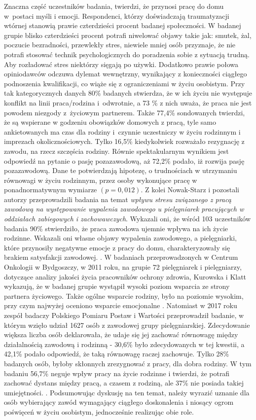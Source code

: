 \documentclass[a4paper,12pt,twoside,openright]{mwrep}
\begin{document}
 
  Znaczna część uczestników badania,  twierdzi, że przynosi pracę do domu w~postaci myśli i emocji. Respondenci, którzy doświadczają traumatyzacji wtórnej stanowią prawie czterdzieści procent badanej społeczności. W badanej grupie blisko czterdzieści procent potrafi niwelować objawy takie jak: smutek, żal, poczucie bezradności, przewlekły stres, niewiele mniej osób  przyznaje, że nie potrafi stosować technik psychologicznych do poradzenia sobie z sytuacją trudną.  Aby rozładować stres niektórzy  sięgają  po używki.   Dodatkowo prawie połowa opiniodawców odczuwa dylemat wewnętrzny, wynikający z konieczności ciągłego podnoszenia kwalifikacji, co wiąże się z ograniczeniami w życiu osobistym.  Przy tak kategorycznych danych 80\% badanych  stwierdza, że w ich życiu nie występuje konflikt na linii praca/rodzina i~odwrotnie, a  73 \%  z nich uważa, że praca nie jest powodem niezgody z~życiowym partnerem.  Także 77,4\%   sondowanych  twierdzi, że są wspierane w godzeniu obowiązków domowych z pracą, tyle samo ankietowanych ma czas dla rodziny i~czynnie uczestniczy w życiu rodzinnym i imprezach okolicznościowych. Tylko 16,5\%  kiedykolwiek rozważało rezygnację z zawodu, na rzecz szczęścia rodziny. Równie spektakularnym wynikiem jest odpowiedź na pytanie o pasję pozazawodową, aż 72,2\%  podało, iż rozwija pasję pozazawodową. Dane te potwierdzają hipotezę, o trudnościach w utrzymaniu równowagi  w życiu rodzinnym, przez osoby wykonujące pracę w ponadnormatywnym wymiarze  $(p=0,012)$.  Z kolei  Nowak-Starz i pozostali autorzy przeprowadzili badania na temat \textit{ wpływu stresu związanego z pracą zawodową na występowanie wypalenia zawodowego u pielęgniarek pracujących w oddziałach zabiegowych i zachowawczych}. Wykazali oni, że wśród 103 uczestników badania 90\% stwierdziło, że  praca zawodowa ujemnie wpływa na ich życie rodzinne. Wskazali oni  własne objawy wypalenia zawodowego, a pielęgniarki, które przynosiły negatywne emocje z pracy do domu, charakteryzowały się brakiem satysfakcji zawodowej. \cite{nowak}. W badaniach  przeprowadzonych w Centrum Onkologii w Bydgoszczy, w 2011 roku, na grupie 72 pielęgniarek i pielęgniarzy, dotyczące analizy jakości życia pracowników ochrony zdrowia, Kurowska i Klatt  wykazują, że w badanej grupie wystąpił wysoki poziom wsparcia ze strony partnera życiowego. Także ogólne wsparcie rodziny, było na poziomie wysokim, przy czym najwyżej oceniono wsparcie emocjonalne \cite{poziom}. Natomiast w 2017 roku zespół badaczy Polskiego Pomiaru Postaw i Wartości przeprowadził badanie, w którym wzięło udział 1627 osób z zawodowej grupy pielęgniarskiej. Zdecydowanie większa liczba osób deklarowała, że udaje się jej zachować równowagę między działalnością zawodową i rodzinną - 30,6\% było zdecydowanych w tej kwestii, a 42,1\% podało odpowiedź, że taką równowagę raczej zachowuje. Tylko 28\% badanych osób, byłoby skłonnych zrezygnować z pracy, dla dobra rodziny. W tym badaniu  56,7\% neguje wpływ pracy na życie rodzinne i twierdzi, że potrafi zachować dystans między pracą, a czasem z rodziną, ale 37\% nie posiada takiej umiejętności. \cite{komunikat}.
Podsumowując dyskusję na ten temat, należy wyrazić uznanie dla osób wybierający zawód wymagający ciągłego doskonalenia i niosący ogrom poświęceń w życiu osobistym, jednocześnie realizując obie role.
\end{document}
